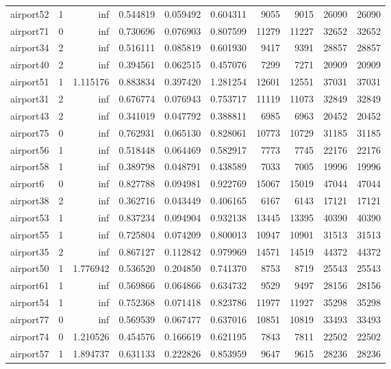 \begin{longtable}{|l|r|r|r|r|r|r|r|r|r|}
airport52 & 1 & inf & 0.544819 & 0.059492 & 0.604311 & 9055 & 9015 & 26090 & 26090 \\
airport71 & 0 & inf & 0.730696 & 0.076903 & 0.807599 & 11279 & 11227 & 32652 & 32652 \\
airport34 & 2 & inf & 0.516111 & 0.085819 & 0.601930 & 9417 & 9391 & 28857 & 28857 \\
airport40 & 2 & inf & 0.394561 & 0.062515 & 0.457076 & 7299 & 7271 & 20909 & 20909 \\
airport51 & 1 & 1.115176 & 0.883834 & 0.397420 & 1.281254 & 12601 & 12551 & 37031 & 37031 \\
airport31 & 2 & inf & 0.676774 & 0.076943 & 0.753717 & 11119 & 11073 & 32849 & 32849 \\
airport43 & 2 & inf & 0.341019 & 0.047792 & 0.388811 & 6985 & 6963 & 20452 & 20452 \\
airport75 & 0 & inf & 0.762931 & 0.065130 & 0.828061 & 10773 & 10729 & 31185 & 31185 \\
airport56 & 1 & inf & 0.518448 & 0.064469 & 0.582917 & 7773 & 7745 & 22176 & 22176 \\
airport58 & 1 & inf & 0.389798 & 0.048791 & 0.438589 & 7033 & 7005 & 19996 & 19996 \\
airport6 & 0 & inf & 0.827788 & 0.094981 & 0.922769 & 15067 & 15019 & 47044 & 47044 \\
airport38 & 2 & inf & 0.362716 & 0.043449 & 0.406165 & 6167 & 6143 & 17121 & 17121 \\
airport53 & 1 & inf & 0.837234 & 0.094904 & 0.932138 & 13445 & 13395 & 40390 & 40390 \\
airport55 & 1 & inf & 0.725804 & 0.074209 & 0.800013 & 10947 & 10901 & 31513 & 31513 \\
airport35 & 2 & inf & 0.867127 & 0.112842 & 0.979969 & 14571 & 14519 & 44372 & 44372 \\
airport50 & 1 & 1.776942 & 0.536520 & 0.204850 & 0.741370 & 8753 & 8719 & 25543 & 25543 \\
airport61 & 1 & inf & 0.569866 & 0.064866 & 0.634732 & 9529 & 9497 & 28156 & 28156 \\
airport54 & 1 & inf & 0.752368 & 0.071418 & 0.823786 & 11977 & 11927 & 35298 & 35298 \\
airport77 & 0 & inf & 0.569539 & 0.067477 & 0.637016 & 10851 & 10819 & 33493 & 33493 \\
airport74 & 0 & 1.210526 & 0.454576 & 0.166619 & 0.621195 & 7843 & 7811 & 22502 & 22502 \\
airport57 & 1 & 1.894737 & 0.631133 & 0.222826 & 0.853959 & 9647 & 9615 & 28236 & 28236 \\

\end{longtable}
